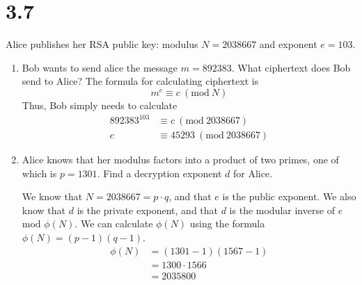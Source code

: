\documentclass{article}
\newcommand{\Mod}[1]{\ (\mathrm{mod}\ #1)}
\begin{document}
\section*{3.7}
Alice publishes her RSA public key: modulus \(N = 2038667\) and exponent \(e = 103\).
\begin{enumerate}[label=(\alph*)]
    \item Bob wants to send alice the message \(m = 892383\). What ciphertext does Bob send to Alice?
          The formula for calculating ciphertext is
          \begin{equation*}
              m^e \equiv c \Mod{N}
          \end{equation*}
          Thus, Bob simply needs to calculate
          \begin{align*}
              892383^{103} & \equiv c \Mod{2038667}     \\
              c            & \equiv 45293 \Mod{2038667}
          \end{align*}
    \item Alice knows that her modulus factors into a product of two primes, one of which is \(p = 1301\).
          Find a decryption exponent \(d\) for Alice.

          We know that \(N = 2038667 = p \cdot q\), and that \(e\) is the public exponent.
          We also know that \(d\) is the private exponent, and that \(d\) is the modular inverse of \(e\) mod \(\phi(N)\).
          We can calculate \(\phi(N)\) using the formula \(\phi(N) = (p-1)(q-1)\).
          \begin{align*}
              \phi(N) & = (1301-1)(1567-1) \\
                      & = 1300 \cdot 1566  \\
                      & = 2035800
          \end{align*}


\end{enumerate}
\end{document}
